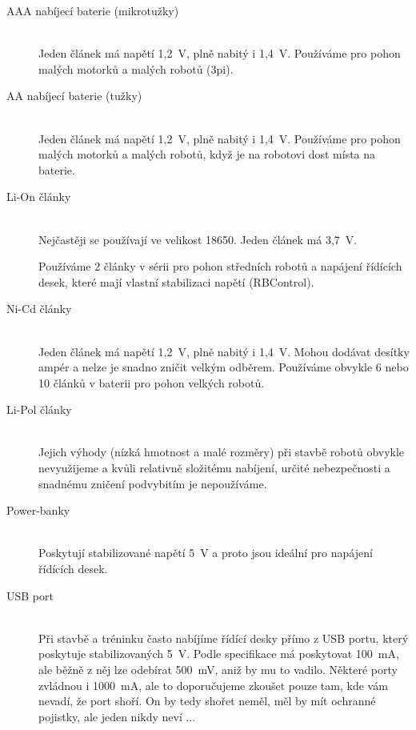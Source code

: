 \begin{description}
	
\item[AAA nabíjecí baterie (mikrotužky)]~\\
Jeden článek má napětí 1,2~V, plně nabitý i 1,4~V. 
Používáme pro pohon malých motorků a malých robotů (3pi). 

\item[AA nabíjecí baterie (tužky)]~\\
Jeden článek má napětí 1,2~V, plně nabitý i 1,4~V. 
Používáme pro pohon malých motorků a malých robotů, když je na robotovi dost místa na baterie. 

\item[Li-On články]~\\
Nejčastěji se používají ve velikost 18650. Jeden článek má 3,7~V. 

Používáme 2 články v sérii pro pohon středních robotů a napájení řídících desek, které mají vlastní stabilizaci napětí (RBControl).   

\item[Ni-Cd články]~\\ 
Jeden článek má napětí 1,2~V, plně nabitý i 1,4~V.
Mohou dodávat desítky ampér a nelze je snadno zničit velkým odběrem.
Používáme obvykle 6 nebo 10 článků v baterii pro pohon velkých robotů.  

\item[Li-Pol články]~\\
Jejich výhody (nízká hmotnost a malé rozměry) při stavbě robotů obvykle nevyužijeme a kvůli relativně složitému nabíjení, určité nebezpečnosti a snadnému zničení podvybitím je nepoužíváme. 

\item[Power-banky]~\\ 
Poskytují stabilizované napětí 5~V a proto jsou ideální pro napájení řídících desek. 


\item[USB port]~\\ 
Při stavbě a tréninku často nabíjíme řídící desky přímo z USB portu, který poskytuje stabilizovaných 5~V. 
Podle specifikace má poskytovat 100~mA, ale běžně z něj lze odebírat 500~mV, aniž by mu to vadilo. 
Některé porty zvládnou i 1000~mA, ale to doporučujeme zkoušet pouze tam, kde vám nevadí, že port shoří. 
On by tedy shořet neměl, měl by mít ochranné pojistky, ale jeden nikdy neví ... 

\end{description}

